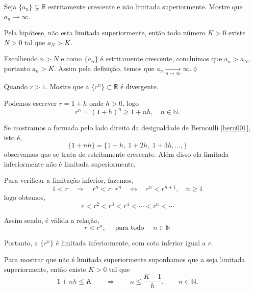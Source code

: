 \begin{exer}
Seja $\{a_n\}\subsetneq \mathbb{R}$ estritamente crescente e n\~{a}o
limitada superiormente. Mostre que $a_n\to\infty$.
\end{exer}

\solo
 Pela hip\'{o}tese, n\~{a}o esta limitada superiormente, ent\~{a}o todo n\'{u}mero $K>0$ existe $N>0$ tal que $a_N>K$.

Escolhendo $n>N$ e como $\{a_n\}$ \'{e} estritamente crescente,
concluímos que $a_n>a_N$, portanto $a_n>K$. Assim pela defini\c{c}\~{a}o,
temos que  $a_n\xrightarrow[n\to\infty]{}\infty$.\hfill \(\lozenge\)

\begin{exer}
Quando $r>1$. Mostre que a \seq  $\{r^n\}\subset \mathbb{R}$ \'{e} divergente.
\end{exer}

\solo Podemos escrever $r=1+h$ onde $h>0$, logo
\begin{equation}\label{bern001}
r^n=(1+h)^n\geq 1+nh,\quad  n\in \mathbb{N}.
\end{equation}

Se mostramos a \seq formada pelo lado direito da desigualdade de Bernoulli \eqref{bern001}, isto \'{e},
\begin{equation*}
    \{1+nh\}=\{1+h,\;1+2h,\;1+3h,\ldots,\}
\end{equation*}
observamos que se trata de \seq estritamente crescente. Al\'{e}m disso
ela limitada inferiormente n\~{a}o \'{e} limitada superiormente.

Para verificar a  limita\c{c}\~{a}o inferior, fazemos,
\begin{equation*}
    1<r\quad \Rightarrow \quad r^n < r\cdot r^n\quad \Leftrightarrow\quad r^n<r^{n+1},\quad n\geq 1
\end{equation*}
logo obtemos,
\begin{equation*}
    r<r^2<r^3<r^4<\cdots<r^n<\cdots
\end{equation*}

Assim sendo, \'{e} v\'{a}lida a rela\c{c}\~{a}o,
\begin{equation*}
    r<r^n,\quad \text{ para todo }\quad n\in \mathbb{N}
\end{equation*}

Portanto, a \seq $\{r^n\}$ \'{e} limitada inferiormente, com cota inferior igual a $r$.

Para mostrar que n\~{a}o \'{e} limitada superiormente suponhamos que a \seq seja limitada superiormente, ent\~{a}o existe $K>0$ tal que
\begin{equation*}
    1+nh\le K\qquad \Rightarrow\qquad n\leq \frac{K-1}{h},\qquad
    n\in \mathbb{N}.
\end{equation*}


